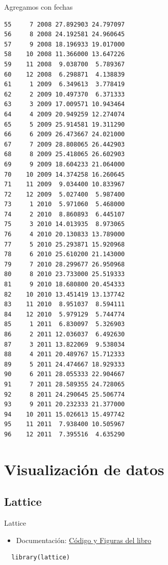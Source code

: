 \documentclass[xcolor={usenames,svgnames,dvipsnames}]{beamer}
\begin{document}
\begin{frame}[fragile,label=sec-5-2-4]{Agregamos con fechas}
\begin{verbatim}
55     7 2008 27.892903 24.797097
56     8 2008 24.192581 24.960645
57     9 2008 18.196933 19.017000
58    10 2008 11.366000 13.647226
59    11 2008  9.038700  5.789367
60    12 2008  6.298871  4.138839
61     1 2009  6.349613  3.778419
62     2 2009 10.497370  6.371333
63     3 2009 17.009571 10.943464
64     4 2009 20.949259 12.274074
65     5 2009 25.914581 19.311290
66     6 2009 26.473667 24.021000
67     7 2009 28.808065 26.442903
68     8 2009 25.418065 26.602903
69     9 2009 18.604233 21.064000
70    10 2009 14.374258 16.260645
71    11 2009  9.034400 10.833967
72    12 2009  5.027400  5.987400
73     1 2010  5.971060  5.468000
74     2 2010  8.860893  6.445107
75     3 2010 14.013935  8.973065
76     4 2010 20.130833 13.789000
77     5 2010 25.293871 15.920968
78     6 2010 25.610200 21.143000
79     7 2010 28.299677 26.950968
80     8 2010 23.733000 25.519333
81     9 2010 18.680800 20.454333
82    10 2010 13.451419 13.137742
83    11 2010  8.951037  8.594111
84    12 2010  5.979129  5.744774
85     1 2011  6.830097  5.326903
86     2 2011 12.036037  6.492630
87     3 2011 13.822069  9.538034
88     4 2011 20.489767 15.712333
89     5 2011 24.474667 18.929333
90     6 2011 28.055333 22.904667
91     7 2011 28.589355 24.728065
92     8 2011 24.290645 25.506774
93     9 2011 20.232333 21.377000
94    10 2011 15.026613 15.497742
95    11 2011  7.938400 10.505967
96    12 2011  7.395516  4.635290
\end{verbatim}
\end{frame}

\section{Visualización de datos}
\label{sec-6}
\subsection{Lattice}
\label{sec-6-1}

\begin{frame}[fragile,label=sec-6-1-1]{Lattice}
 \begin{itemize}
\item Documentación: \href{http://lmdvr.r-forge.r-project.org/figures/figures.html}{Código y Figuras del libro}
\end{itemize}

\lstset{language=R,label= ,caption= ,numbers=none}
\begin{lstlisting}
  library(lattice)
\end{lstlisting}
\end{frame}
\end{document}
